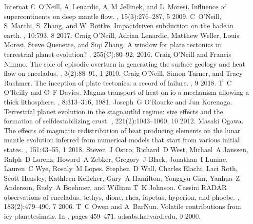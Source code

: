\documentclass[letterpaper,10pt,english]{jupyterBook}
\begin{document}
\begin{sphinxthebibliography}{Internat}
\sphinxAtStartPar
C O'Neill, A Lenardic, A M Jellinek, and L Moresi. Influence of supercontinents on deep mantle flow. , 15(3):276–287, 5 2009.
\sphinxAtStartPar
C O'Neill, S Marchi, S Zhang, and W Bottke. Impact\sphinxhyphen{}driven subduction on the hadean earth. , 10:793, 8 2017.
\sphinxAtStartPar
Craig O'Neill, Adrian Lenardic, Matthew Weller, Louis Moresi, Steve Quenette, and Siqi Zhang. A window for plate tectonics in terrestrial planet evolution? , 255(C):80–92, 2016.
\sphinxAtStartPar
Craig O'Neill and Francis Nimmo. The role of episodic overturn in generating the surface geology and heat flow on enceladus. , 3(2):88–91, 1 2010.
\sphinxAtStartPar
Craig O'Neill, Simon Turner, and Tracy Rushmer. The inception of plate tectonics: a record of failure. , 9 2018.
\sphinxAtStartPar
T C O'Reilly and G F Davies. Magma transport of heat on io \sphinxhyphen{} a mechanism allowing a thick lithosphere. , 8:313–316, 1981.
\sphinxAtStartPar
Joseph G O'Rourke and Jun Korenaga. Terrestrial planet evolution in the stagnant\sphinxhyphen{}lid regime: size effects and the formation of self\sphinxhyphen{}destabilizing crust. , 221(2):1043–1060, 10 2012.
\sphinxAtStartPar
Masaki Ogawa. The effects of magmatic redistribution of heat producing elements on the lunar mantle evolution inferred from numerical models that start from various initial states. , 151:43–55, 1 2018.
\sphinxAtStartPar
Steven J Ostro, Richard D West, Michael A Janssen, Ralph D Lorenz, Howard A Zebker, Gregory J Black, Jonathan I Lunine, Lauren C Wye, Rosaly M Lopes, Stephen D Wall, Charles Elachi, Laci Roth, Scott Hensley, Kathleen Kelleher, Gary A Hamilton, Yonggyu Gim, Yanhua Z Anderson, Rudy A Boehmer, and William T K Johnson. Cassini RADAR observations of enceladus, tethys, dione, rhea, iapetus, hyperion, and phoebe. , 183(2):479–490, 7 2006.
\sphinxAtStartPar
T C Owen and A Bar\sphinxhyphen{}Nun. Volatile contributions from icy planetesimals. In , pages 459–471. adsabs.harvard.edu, 0 2000.

\end{sphinxthebibliography}
\end{document}
